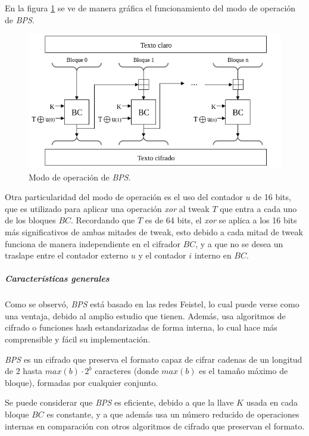 En la figura \ref{modo_de_operacion_BPS} se ve de manera gráfica el 
funcionamiento del modo de operación de \textit{BPS}.

\begin{figure}[H]
  \begin{center}
    \includegraphics[width=0.85\linewidth]
    {../../../../../../diagramas_comunes/bps/modo_de_operacion_bps}
    \caption{Modo de operación de \textit{BPS}.}
    \label{modo_de_operacion_BPS}
   \end{center}
\end{figure}

Otra particularidad del modo de operación es el uso del contador $u$ de 16 
bits, que es utilizado para aplicar una operación \textit{xor} al tweak $T$ 
que entra a cada uno de los bloques $BC$. Recordando que $T$ es de 64 bits, 
el \textit{xor} se aplica a los 16 bits más significativos de ambas mitades 
de tweak, esto debido a cada mitad de tweak funciona de manera independiente 
en el cifrador $BC$, y a que no se desea un traslape entre el contador externo 
$u$ y el contador $i$ interno en $BC$.


\subparagraph{Características generales}

Como se observó, \textit{BPS} está basado en las redes Feistel, lo cual puede 
verse como una ventaja, debido al amplio estudio que tienen. Además, usa 
algoritmos de cifrado o funciones hash estandarizadas de forma interna, lo 
cual hace más comprensible y fácil su implementación.

\textit{BPS} es un cifrado que preserva el formato capaz de cifrar cadenas de 
un longitud de $2$ hasta $max(b) \cdot 2^{b}$ caracteres (donde $max(b)$ es el 
tamaño máximo de bloque), formadas por cualquier conjunto.

Se puede considerar que \textit{BPS} es eficiente, debido a que la llave $K$ 
usada en cada bloque $BC$ es constante, y a que además usa un número reducido 
de operaciones internas en comparación con otros algoritmos de cifrado que 
preservan el formato.

